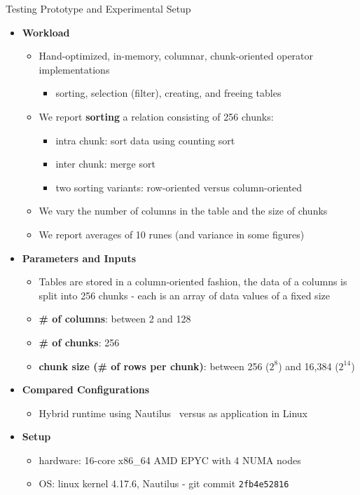 \begin{block}{Testing Prototype and Experimental Setup}
  \begin{itemize}
    \item \textbf{Workload}
      \begin{itemize}
      \item Hand-optimized, in-memory, columnar, chunk-oriented operator
        implementations
    \begin{itemize}
    \item sorting, selection (filter), creating, and freeing tables
      \end{itemize}
  \item We report \textbf{sorting} a relation consisting of 256 chunks:
    \begin{itemize}
    \item intra chunk: sort data using counting sort
    \item inter chunk: merge sort
    \item two sorting variants: row-oriented versus column-oriented
\end{itemize}
\item We vary the number of columns in the table and the size of chunks
\item We report averages of 10 runes (and variance in some figures)
  \end{itemize}
\item \textbf{Parameters and Inputs}
  \begin{itemize}
  \item Tables are stored in a column-oriented fashion, the data of a columns is split into 256 chunks - each is an array of data values of a fixed size 
  \item \textbf{\# of columns}: between 2 and 128
  \item \textbf{\# of chunks}: 256
  \item \textbf{chunk size (\# of rows per chunk)}: between 256 ($2^8$) and 16,384 ($2^{14}$)
  \end{itemize}
\item \textbf{Compared Configurations}
    \begin{itemize}
    \item Hybrid runtime using Nautilus~\cite{HALE:2015:NAUTILUS} versus as application in Linux 
    \end{itemize}
  \item \textbf{Setup}
    \begin{itemize}
    \item hardware: 16-core x86\_64 AMD EPYC with 4 NUMA nodes
    \item OS: linux kernel 4.17.6, Nautilus - git commit \texttt{2fb4e52816}
    \end{itemize}
  \end{itemize}
\end{block}
